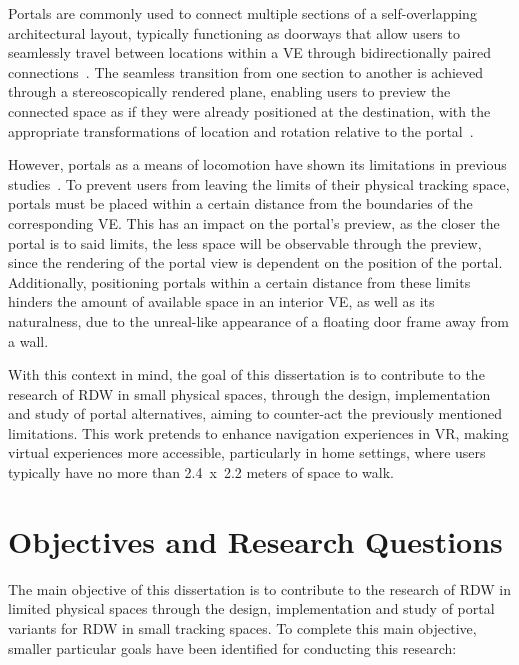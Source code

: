 Portals are commonly used to connect multiple sections of a self-overlapping architectural layout, typically functioning as doorways that allow users 
to seamlessly travel between locations within a \gls{VE} through bidirectionally paired connections~\cite{Freitag2014,Lochner2021,Liu2018b}.
The seamless transition from one section to another is achieved through a stereoscopically rendered plane, enabling users to preview the connected 
space as if they were already positioned at the destination, with the appropriate transformations of location and rotation 
relative to the portal~\cite{Lochner2021,Jaksties2022}.

However, portals as a means of locomotion have shown its limitations in previous studies~\cite{Rebelo2024,Rebelo2025}. 
To prevent users from leaving the limits of their physical tracking space, portals must be placed within a certain distance from the boundaries 
of the corresponding \gls{VE}. This has an impact on the portal's preview, as the closer the portal is to said limits, 
the less space will be observable through the preview, since the rendering of the portal view is dependent on the position of the portal. 
Additionally, positioning portals within a certain distance from these limits hinders the amount of available space in an interior \gls{VE}, 
as well as its naturalness, due to the unreal-like appearance of a floating door frame away from a wall. 

With this context in mind, the goal of this dissertation is to contribute to the research of \gls{RDW} in small physical spaces, through the design,
implementation and study of portal alternatives, aiming to counter-act the previously mentioned limitations.
This work pretends to enhance navigation experiences in \gls{VR}, making virtual experiences more accessible, particularly in home settings, 
where users typically have no more than 2.4~x~2.2 meters of space to walk.


\section{Objectives and Research Questions}
\label{sec:objectives-and-researh-questions}

The main objective of this dissertation is to contribute to the research of \gls{RDW} in limited physical spaces through the design, implementation and 
study of portal variants for \gls{RDW} in small tracking spaces. To complete this main objective, smaller particular goals have been 
identified for conducting this research:

